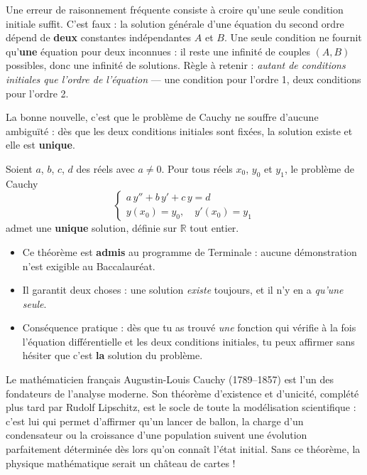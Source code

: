 \documentclass[11pt]{article}
\newcounter{popsec}
\newcounter{popsub}
\newcommand{\courssub}[1]{%
  \stepcounter{popsub}%
  \par\vspace{9pt}\noindent{\popxbold\fontsize{11.5}{13}\selectfont\color{popink}{\color{poporange}\thepopsec.\thepopsub}\hspace{6pt}#1}\par\nopagebreak\vspace{4pt}
}
\begin{document}
\begin{attention}
Une erreur de raisonnement fréquente consiste à croire qu'une seule condition initiale suffit. C'est faux : la solution générale d'une équation du second ordre dépend de \textbf{deux} constantes indépendantes $A$ et $B$. Une seule condition ne fournit qu'\textbf{une} équation pour deux inconnues : il reste une infinité de couples $(A, B)$ possibles, donc une infinité de solutions. Règle à retenir : \emph{autant de conditions initiales que l'ordre de l'équation} — une condition pour l'ordre 1, deux conditions pour l'ordre 2.
\end{attention}

\courssub{Théorème d'existence et d'unicité}

La bonne nouvelle, c'est que le problème de Cauchy ne souffre d'aucune ambiguïté : dès que les deux conditions initiales sont fixées, la solution existe et elle est \textbf{unique}.

\begin{propriete}
Soient $a$, $b$, $c$, $d$ des réels avec $a \neq 0$. Pour tous réels $x_0$, $y_0$ et $y_1$, le problème de Cauchy
\[
\begin{cases}
a\,y'' + b\,y' + c\,y = d \\
y(x_0) = y_0, \quad y'(x_0) = y_1
\end{cases}
\]
admet une \textbf{unique} solution, définie sur $\mathbb{R}$ tout entier.
\end{propriete}

\begin{aretenir}
\begin{itemize}
\item Ce théorème est \textbf{admis} au programme de Terminale : aucune démonstration n'est exigible au Baccalauréat.
\item Il garantit deux choses : une solution \emph{existe} toujours, et il n'y en a \emph{qu'une seule}.
\item Conséquence pratique : dès que tu as trouvé \emph{une} fonction qui vérifie à la fois l'équation différentielle et les deux conditions initiales, tu peux affirmer sans hésiter que c'est \textbf{la} solution du problème.
\end{itemize}
\end{aretenir}

\begin{savaistu}
Le mathématicien français Augustin-Louis Cauchy (1789--1857) est l'un des fondateurs de l'analyse moderne. Son théorème d'existence et d'unicité, complété plus tard par Rudolf Lipschitz, est le socle de toute la modélisation scientifique : c'est lui qui permet d'affirmer qu'un lancer de ballon, la charge d'un condensateur ou la croissance d'une population suivent une évolution parfaitement déterminée dès lors qu'on connaît l'état initial. Sans ce théorème, la physique mathématique serait un château de cartes !
\end{savaistu}
\end{document}
